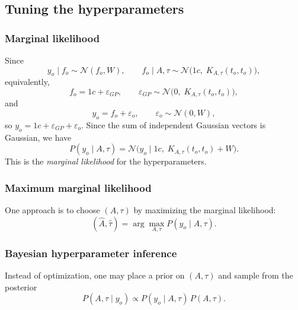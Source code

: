 \documentclass[11pt, titlepage]{article} %
\numberwithin{equation}{section}
\theoremstyle{definition}
\numberwithin{assumption}{section}
\begin{document}
\subsection{Tuning the hyperparameters}

\subsubsection*{Marginal likelihood}

Since
\begin{equation*}
    y_o\mid f_o \sim \mathcal{N}(f_o,W),
    \qquad
    f_o\mid A,\tau \sim \mathcal{N}\!\bigl(1c,\;K_{A,\tau}(t_o,t_o)\bigr),
\end{equation*}
equivalently,
\begin{equation*}
    f_o=1c+\varepsilon_{GP}, \qquad\varepsilon_{GP}\sim\mathcal{N}\!\bigl(0,\;K_{A,\tau}(t_o,t_o)\bigr),
\end{equation*}
and
\begin{equation*}
    y_o=f_o+\varepsilon_o,
    \qquad \varepsilon_o\sim \mathcal{N}(0,W),
\end{equation*}
so $y_o=1c+\varepsilon_{GP}+\varepsilon_o$.
Since the sum of independent Gaussian vectors is Gaussian, we have
\begin{equation*}
    P(y_o\mid A,\tau)
    =
    \mathcal{N}\!\bigl(y_o\mid 1c,\;K_{A,\tau}(t_o,t_o)+W\bigr).
\end{equation*}
This is the \textit{marginal likelihood} for the hyperparameters.

\subsubsection*{Maximum marginal likelihood}

One approach is to choose $(A,\tau)$ by maximizing the marginal likelihood:
\begin{equation*}
    (\hat A,\hat\tau)
    =
    \arg\max_{A,\tau} P(y_o\mid A,\tau).
\end{equation*}

\subsubsection*{Bayesian hyperparameter inference}

Instead of optimization, one may place a prior on $(A,\tau)$ and sample from the posterior
\begin{equation*}
    P(A,\tau\mid y_o)\propto P(y_o\mid A,\tau)\,P(A,\tau).
\end{equation*}
\end{document}
